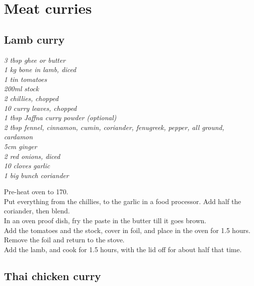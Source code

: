 \documentclass{tufte-book}
\begin{document}
\chapter{Meat curries}

\section{Lamb curry}

\emph{3 tbsp ghee or butter
\\1 kg bone in lamb, diced
\\1 tin tomatoes
\\200ml stock
\\2 chillies, chopped
\\10 curry leaves, chopped
\\1 tbsp Jaffna curry powder (optional)
\\2 tbsp fennel, cinnamon, cumin, coriander, fenugreek, pepper, all ground, cardamon
\\5cm ginger
\\2 red onions, diced
\\10 cloves garlic
\\1 big bunch coriander}

Pre-heat oven to 170\celsius.
\\Put everything from the chillies, to the garlic in a food processor. Add half the coriander, then blend.
\\In an oven proof dish, fry the paste in the butter till it goes brown.
\\Add the tomatoes and the stock, cover in foil, and place in the oven for 1.5 hours.
\\Remove the foil and return to the stove.
\\Add the lamb, and cook for 1.5 hours, with the lid off for about half that time.


\section{Thai chicken curry}
\end{document}
